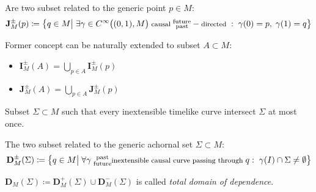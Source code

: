 \documentclass[Main]{subfiles}
\begin{document}
	\begin{definition}
		Are two subset related to the generic point $p	\in M$:
		\begin{displaymath}
			\mathbf{J}_M^\pm(p) \coloneqq \big\{ q \in M \big\vert \; \exists \gamma \in C^\infty\big((0,1), M\big)\; \textrm{\footnotesize causal } \substack{\textrm{future}\\ \textrm{past} } -\textrm{\footnotesize directed }:\; \gamma(0)=p,\; \gamma(1)=q  \big\}
		\end{displaymath}		
	\end{definition}

	\begin{notationfix}
		Former concept can be naturally extended to subset $A \subset M$:
			\begin{itemize}
				\item $\mathbf{I}_M^\pm(A) = \bigcup_{p\in A} \mathbf{I}_M^\pm(p) $
				\item $\mathbf{J}_M^\pm(A) = \bigcup_{p\in A} \mathbf{J}_M^\pm(p) $
			\end{itemize}
	\end{notationfix}

	\begin{definition}
		Subset $\Sigma \subset M$ such that every inextensible timelike curve intersect $\Sigma$ at most once.
	\end{definition}

	\begin{definition}
		The two subset related to the generic achornal set $\Sigma \subset M$:
		\begin{displaymath}		
			\mathbf{D}_M^\pm(\Sigma) \coloneqq \big\{ q \in M \big\vert \; \forall \gamma \substack{\textrm{ past}\\ \textrm{ future} }\textrm{\footnotesize inextensible causal curve passing through }q : \; \gamma(I) \cap \Sigma \neq \emptyset  \big\}
		\end{displaymath}		
	\end{definition}

	\begin{notationfix}
		$\mathbf{D}_M(\Sigma)  \coloneq \mathbf{D}_M^+(\Sigma) \cup \mathbf{D}_M^-(\Sigma)$ is called \emph{total domain of dependence}.
	\end{notationfix}
\end{document}
